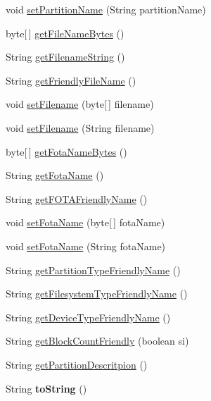 \begin{DoxyCompactItemize}
\item 
void \hyperlink{classcom_1_1casual__dev_1_1libpit_x_1_1_pit_entry_af77c18bae0d84764daba7497723383a7}{set\-Partition\-Name} (String partition\-Name)
\item 
byte\mbox{[}$\,$\mbox{]} \hyperlink{classcom_1_1casual__dev_1_1libpit_x_1_1_pit_entry_acea03a14dd52ba79a31e77108cb2c3e8}{get\-File\-Name\-Bytes} ()
\item 
String \hyperlink{classcom_1_1casual__dev_1_1libpit_x_1_1_pit_entry_a74847ea9d6d65ff9693838438242bb64}{get\-Filename\-String} ()
\item 
String \hyperlink{classcom_1_1casual__dev_1_1libpit_x_1_1_pit_entry_a25b468609d8a2b259b4b01dac4ca60ce}{get\-Friendly\-File\-Name} ()
\item 
void \hyperlink{classcom_1_1casual__dev_1_1libpit_x_1_1_pit_entry_acaf9449284b2b9a4705ee0142707645c}{set\-Filename} (byte\mbox{[}$\,$\mbox{]} filename)
\item 
void \hyperlink{classcom_1_1casual__dev_1_1libpit_x_1_1_pit_entry_ac23c8769b1610befb3ba95530e470cd0}{set\-Filename} (String filename)
\item 
byte\mbox{[}$\,$\mbox{]} \hyperlink{classcom_1_1casual__dev_1_1libpit_x_1_1_pit_entry_a2e2c8438b928d7f250d6aca0f4215f4b}{get\-Fota\-Name\-Bytes} ()
\item 
String \hyperlink{classcom_1_1casual__dev_1_1libpit_x_1_1_pit_entry_a50e74a38bdc61ab5011549285965c07f}{get\-Fota\-Name} ()
\item 
String \hyperlink{classcom_1_1casual__dev_1_1libpit_x_1_1_pit_entry_a8e4629067622bece1e080e533aa688d0}{get\-F\-O\-T\-A\-Friendly\-Name} ()
\item 
void \hyperlink{classcom_1_1casual__dev_1_1libpit_x_1_1_pit_entry_a0c8afaab9a0b52020d26a73de3f8c531}{set\-Fota\-Name} (byte\mbox{[}$\,$\mbox{]} fota\-Name)
\item 
void \hyperlink{classcom_1_1casual__dev_1_1libpit_x_1_1_pit_entry_aacf449d564d669ec739f3a633413b7de}{set\-Fota\-Name} (String fota\-Name)
\item 
String \hyperlink{classcom_1_1casual__dev_1_1libpit_x_1_1_pit_entry_a7b646425ad13f3c7497d9b0308e48823}{get\-Partition\-Type\-Friendly\-Name} ()
\item 
String \hyperlink{classcom_1_1casual__dev_1_1libpit_x_1_1_pit_entry_aca73e7134dd5bbcb220ef16e1ee1937c}{get\-Filesystem\-Type\-Friendly\-Name} ()
\item 
String \hyperlink{classcom_1_1casual__dev_1_1libpit_x_1_1_pit_entry_aae7d3d0e40549dfe72fabd512cbf7b2e}{get\-Device\-Type\-Friendly\-Name} ()
\item 
String \hyperlink{classcom_1_1casual__dev_1_1libpit_x_1_1_pit_entry_aead678d125364dede2fa82dc6b25c14b}{get\-Block\-Count\-Friendly} (boolean si)
\item 
String \hyperlink{classcom_1_1casual__dev_1_1libpit_x_1_1_pit_entry_a89eca091c3df99ea0d09c4697d3f0205}{get\-Partition\-Descritpion} ()
\item 
\hypertarget{classcom_1_1casual__dev_1_1libpit_x_1_1_pit_entry_ae7e7bc080f53df0e86f7bfb966e38159}{String {\bfseries to\-String} ()}\label{classcom_1_1casual__dev_1_1libpit_x_1_1_pit_entry_ae7e7bc080f53df0e86f7bfb966e38159}


\end{DoxyCompactItemize}
